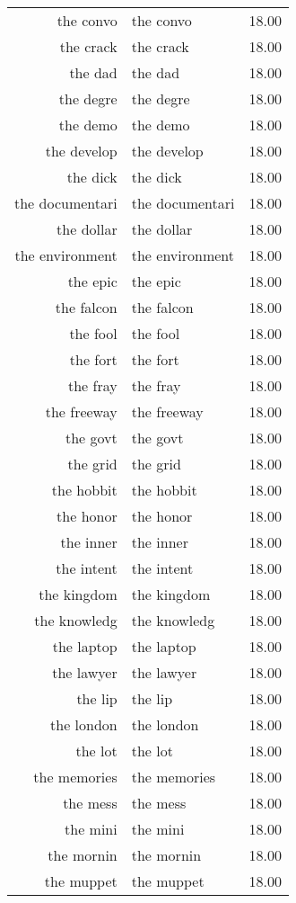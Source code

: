 \begin{table}[ht]
\begin{tabular}{rlr}
  the convo & the convo & 18.00 \\ 
  the crack & the crack & 18.00 \\ 
  the dad & the dad & 18.00 \\ 
  the degre & the degre & 18.00 \\ 
  the demo & the demo & 18.00 \\ 
  the develop & the develop & 18.00 \\ 
  the dick & the dick & 18.00 \\ 
  the documentari & the documentari & 18.00 \\ 
  the dollar & the dollar & 18.00 \\ 
  the environment & the environment & 18.00 \\ 
  the epic & the epic & 18.00 \\ 
  the falcon & the falcon & 18.00 \\ 
  the fool & the fool & 18.00 \\ 
  the fort & the fort & 18.00 \\ 
  the fray & the fray & 18.00 \\ 
  the freeway & the freeway & 18.00 \\ 
  the govt & the govt & 18.00 \\ 
  the grid & the grid & 18.00 \\ 
  the hobbit & the hobbit & 18.00 \\ 
  the honor & the honor & 18.00 \\ 
  the inner & the inner & 18.00 \\ 
  the intent & the intent & 18.00 \\ 
  the kingdom & the kingdom & 18.00 \\ 
  the knowledg & the knowledg & 18.00 \\ 
  the laptop & the laptop & 18.00 \\ 
  the lawyer & the lawyer & 18.00 \\ 
  the lip & the lip & 18.00 \\ 
  the london & the london & 18.00 \\ 
  the lot & the lot & 18.00 \\ 
  the memories & the memories & 18.00 \\ 
  the mess & the mess & 18.00 \\ 
  the mini & the mini & 18.00 \\ 
  the mornin & the mornin & 18.00 \\ 
  the muppet & the muppet & 18.00 \\ 

\end{tabular}
\end{table}
